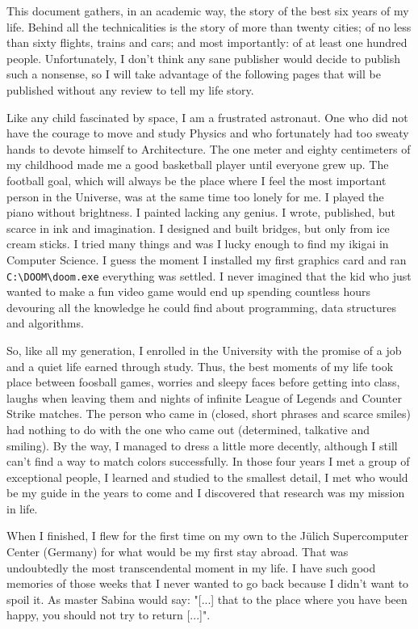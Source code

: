 This document gathers, in an academic way, the story of the best six years of my life. Behind all the technicalities is the story of more than twenty cities; of no less than sixty flights, trains and cars; and most importantly: of at least one hundred people. Unfortunately, I don't think any sane publisher would decide to publish such a nonsense, so I will take advantage of the following pages that will be published without any review to tell my life story.

Like any child fascinated by space, I am a frustrated astronaut. One who did not have the courage to move and study Physics and who fortunately had too sweaty hands to devote himself to Architecture. The one meter and eighty centimeters of my childhood made me a good basketball player until everyone grew up. The football goal, which will always be the place where I feel the most important person in the Universe, was at the same time too lonely for me. I played the piano without brightness. I painted lacking any genius. I wrote, published, but scarce in ink and imagination. I designed and built bridges, but only from ice cream sticks. I tried many things and was I lucky enough to find my ikigai in Computer Science. I guess the moment I installed my first graphics card and ran \verb|C:\DOOM\doom.exe| everything was settled. I never imagined that the kid who just wanted to make a fun video game would end up spending countless hours devouring all the knowledge he could find about programming, data structures and algorithms.

So, like all my generation, I enrolled in the University with the promise of a job and a quiet life earned through study. Thus, the best moments of my life took place between foosball games, worries and sleepy faces before getting into class, laughs when leaving them and nights of infinite League of Legends and Counter Strike matches. The person who came in (closed, short phrases and scarce smiles) had nothing to do with the one who came out (determined, talkative and smiling). By the way, I managed to dress a little more decently, although I still can't find a way to match colors successfully. In those four years I met a group of exceptional people, I learned and studied to the smallest detail, I met who would be my guide in the years to come and I discovered that research was my mission in life.

When I finished, I flew for the first time on my own to the Jülich Supercomputer Center (Germany) for what would be my first stay abroad. That was undoubtedly the most transcendental moment in my life. I have such good memories of those weeks that I never wanted to go back because I didn't want to spoil it. As master Sabina would say: "[...] that to the place where you have been happy, you should not try to return [...]".

